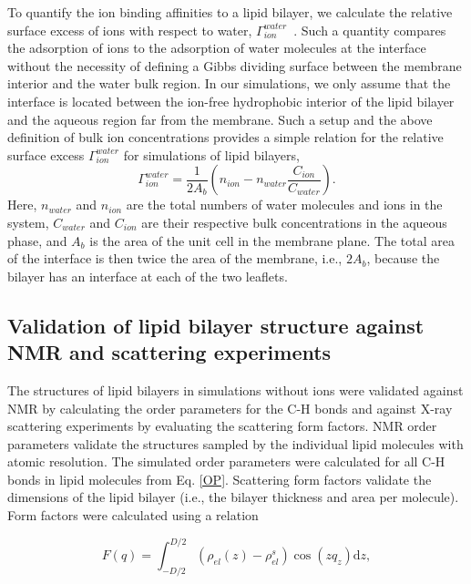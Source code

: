 \documentclass[journal=jpcbfk,manuscript=article]{achemso}
\begin{document}
To quantify the ion binding affinities to a lipid bilayer, we calculate the relative surface excess of ions with respect to water, $\Gamma_{ion}^{water}$~\cite{chattorajBOOK}. Such a quantity compares the adsorption of ions to the adsorption of water molecules at the interface without the necessity of defining a Gibbs dividing surface between the membrane interior and the water bulk region. In our simulations, we only assume that the interface is located between the ion-free hydrophobic interior of the lipid bilayer and the aqueous region far from the membrane.  Such a setup and the above definition of bulk ion concentrations provides a simple relation for the relative surface excess $\Gamma_{ion}^{water}$ for simulations of lipid bilayers,
 \begin{equation}\label{surfexcess}
  \Gamma_{ion}^{water}=\frac{1}{2A_b} \left ( n_{ion} - n_{water} \frac{C_{ion}}{C_{water}} \right ).
\end{equation}
Here, $n_{water}$ and $n_{ion}$ are the total numbers of water molecules and ions in the system,
$C_{water}$ and $C_{ion}$ are their respective bulk concentrations in the aqueous phase,
and $A_b$ is the area of the unit cell in the membrane plane.
The total area of the interface is then twice the area of the membrane, i.e., $2A_b$,
because the bilayer has an interface at each of the two leaflets.



\subsection{Validation of lipid bilayer structure against NMR and scattering experiments}
The structures of lipid bilayers in simulations without ions were validated against NMR by calculating the order parameters for the C-H bonds and against \mbox{X-ray} scattering experiments by evaluating the scattering form factors. NMR order parameters validate the structures sampled by the individual lipid molecules with atomic resolution. The simulated order parameters were calculated for all C-H bonds in lipid molecules from Eq. \ref{OP}. Scattering form factors validate the dimensions of the lipid bilayer (i.e., the bilayer thickness and area per molecule). Form factors were calculated using a relation

\begin{equation}
  F(q) = \int _{-D/2} ^{D/2} \left ( \rho_{el}(z) - \rho_{el}^s \right ) \cos (zq_z) \mathrm{d}z,
\end{equation}
\end{document}
